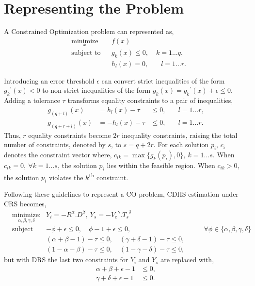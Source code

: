 \documentclass[10pt]{article}
\begin{document}
\section{Representing the Problem}\label{sec:rep}

A Constrained Optimization problem can represented as,
\begin{equation*}
  \begin{aligned}
    & \underset{x}{\text{minimize}}
    & & f(x) \\
    & \text{subject to}
    & & g_k(x) \leq 0,&\; k = 1\dots q,\\
    &&& h_l(x) = 0,&\quad l = 1\dots r.
  \end{aligned}
\end{equation*}

Introducing an error threshold $\epsilon$ can convert strict inequalities of the form ${g_k}^{\prime}(x) < 0$ to
non-strict inequalities of the form $g_k(x) = {g_k}^{\prime}(x) + \epsilon \leq 0$. Adding a tolerance $\tau$ transforms
equality constraints to a pair of inequalities,
\begin{equation*}
  \begin{aligned}
    g_{(q+l)}(x) &= h_l(x) - \tau &\leq 0,&\quad l = 1\dots r,\\
    g_{(q+r+l)}(x) &= {-}h_l(x) - \tau &\leq 0,&\quad l = 1\dots r.
  \end{aligned}
\end{equation*}
Thus, $r$ equality constraints become $2r$ inequality constraints, raising the total number of constraints, denoted by
$s$, to $s = q + 2r$. For each solution $p_i$, $c_i$ denotes the constraint vector where, $c_{ik} = \max\{g_k(p_i),
0\},~k=1\dots s$. When $c_{ik} = 0,~\forall k=1\dots s$, the solution $p_i$ lies within the feasible region. When $c_{ik} > 0$,
the solution $p_i$ violates the $k$\textsuperscript{th} constraint.

Following these guidelines to represent a CO problem, CDHS estimation under CRS becomes,
\begin{equation}\label{eq:cdhscrs}
  \begin{aligned}
    & \underset{\alpha,\beta,\gamma,\delta}{\text{minimize:}}
    & Y_i = {-}R^\alpha.D^\beta,\ Y_s = {-}{V_e}^\gamma.{T_s}^\delta\\
    & \text{subject to:}
    &  {-}\phi + \epsilon \leq 0,\quad\phi - 1 + \epsilon \leq 0, &\quad\quad \forall \phi\in\{\alpha,\beta,\gamma,\delta\}\\
    && (\alpha+\beta-1) - \tau \leq 0,\quad(\gamma+\delta-1) - \tau \leq 0,\\
    && (1-\alpha-\beta) - \tau \leq 0,\quad(1-\gamma-\delta) - \tau \leq 0,
  \end{aligned}
\end{equation}
but with DRS the last two constraints for $Y_i$ and $Y_s$ are replaced with,
\begin{equation}\label{eq:cdhsdrs}
  \begin{aligned}
    \alpha + \beta + \epsilon - 1 &\leq 0,\\
    \gamma + \delta + \epsilon - 1 &\leq 0.
  \end{aligned}
\end{equation}
\end{document}
